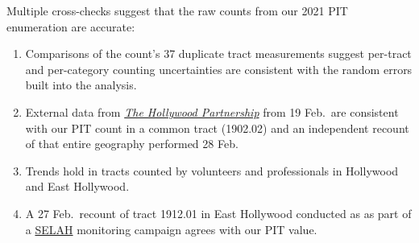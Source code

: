 \documentclass[11pt,twocolumn]{article}
\begin{document}
Multiple cross-checks suggest that the raw counts from our 2021 PIT enumeration are accurate:
\begin{enumerate}
	\item Comparisons of the count's 37 duplicate tract measurements suggest per-tract and per-category
		counting uncertainties are consistent with the random errors built into the analysis.
	\item External data from \href{https://hollywoodpartnership.com/}{\it The Hollywood Partnership} 
		from 19 Feb.\ are consistent with our PIT count in a common tract (1902.02) and an independent 
		recount of that entire geography performed 28 Feb.%
	\item Trends hold in tracts counted by volunteers and professionals in Hollywood and East Hollywood.
	\item A 27 Feb.\ recount of tract 1912.01 in East Hollywood conducted as as part of a
		\href{https://selahnch.org}{SELAH} monitoring campaign agrees with our PIT value.%
\end{enumerate}
\end{document}
